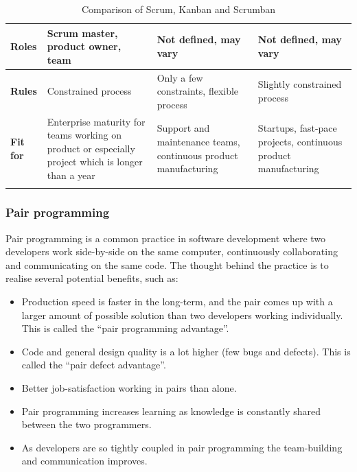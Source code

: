 \begin{center}
\begin{longtable}{| p{2.6cm} | p{3.9cm} | p{3.9cm} | p{3.9cm} |}
    \textbf{Roles} & Scrum master, product owner, team & Not defined, may vary & Not defined, may vary \\ \hline
    \textbf{Rules} & Constrained process & Only a few constraints, flexible process & Slightly constrained process \\ \hline
    \textbf{Fit for} & Enterprise maturity for teams working on product or especially project which is longer than a year & Support and maintenance teams, continuous product manufacturing & Startups, fast-pace projects, continuous product manufacturing \\ \hline 

    \caption{Comparison of Scrum, Kanban and Scrumban}
    \label{coskas}
    \end{longtable}
\end{center}


\subsubsection{Pair programming}

Pair programming is a common practice in software development where two developers work side-by-side on the same computer, continuously collaborating and communicating on the same code. The thought behind the practice is to realise several potential benefits, such as:


\begin{itemize}
  \item Production speed is faster in the long-term, and the pair comes up with a larger amount of possible solution than two developers working individually. This is called the ``pair programming advantage''.
  \item Code and general design quality is a lot higher (few bugs and defects). This is called the ``pair defect advantage''.
  \item Better job-satisfaction working in pairs than alone.
  \item Pair programming increases learning as knowledge is constantly shared between the two programmers.
  \item As developers are so tightly coupled in pair programming the team-building and communication improves.
\end{itemize}

